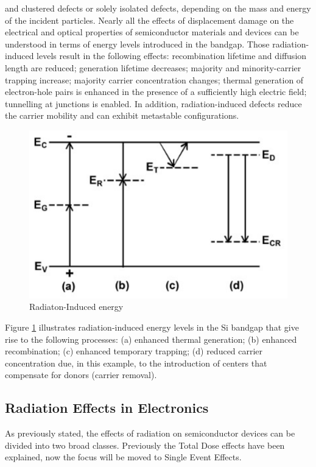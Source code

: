 \documentclass[./dissertation.tex]{subfiles}
\begin{document}
and clustered defects or solely isolated defects, depending on the mass and energy of
the incident particles. Nearly all the effects of displacement damage on the electrical and optical properties of semiconductor materials and devices can be understood
in terms of energy levels introduced in the bandgap. Those radiation-induced levels
result in the following effects: recombination lifetime and diffusion length are reduced; generation lifetime decreases; majority and minority-carrier trapping increase;
majority carrier concentration changes; thermal generation of electron-hole pairs is
enhanced in the presence of a sufficiently high electric field; tunnelling at junctions
is enabled. In addition, radiation-induced defects reduce the carrier mobility and can
exhibit metastable configurations\cite{bib10}.

\begin{figure}[h!]
\centering
  \includegraphics[scale = 0.50]{imgs/displ.png}
  \caption{Radiaton-Induced energy}
  \label{fig:displ}
\end{figure}
Figure \ref{fig:displ} illustrates radiation-induced energy
levels in the Si bandgap that give rise to the following processes: (a) enhanced thermal generation; (b) enhanced recombination; (c) enhanced temporary trapping; (d)
reduced carrier concentration due, in this example, to the introduction of centers that
compensate for donors (carrier removal).
\subsection{Radiation Effects in Electronics}
As previously stated, the effects of radiation on semiconductor devices can be divided into two broad classes. Previously the Total Dose effects have been explained, now the focus will be moved to Single Event Effects.
\end{document}
